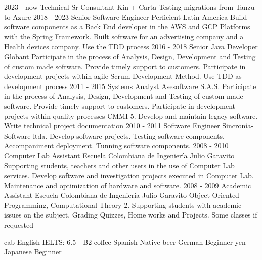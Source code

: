 \documentclass[icon]{twentysecondcv}
\begin{document}
\begin{twenty}
\twentyitem
    {2023 - now}
    {Technical Sr Consultant}
    {Kin + Carta}
    {Testing migrations from Tanzu to Azure}
\twentyitem
    {2018 - 2023}
    {Senior Software Engineer}
    {Perficient Latin America}
    {Build software components as a Back End developer in the AWS and GCP Platforms with the Spring Framework. Built software for an advertising company and a Health devices company. Use the TDD process}
\twentyitem
    {2016 - 2018}
    {Senior Java Developer}
    {Globant}
    {Participate in the process of Analysis, Design, Development and Testing of custom made software. Provide timely support to customers. Participate in development projects within agile Scrum Development Method. Use TDD as development process}
  \twentyitem
    {2011 - 2015}
    {Systems Analyst}
    {Asesoftware S.A.S.}
    {Participate in the process of Analysis, Design, Development and Testing of custom made software. Provide timely support to customers. Participate in development projects within quality processes CMMI 5. Develop and maintain legacy software. Write technical project documentation}
  \twentyitem
    {2010 - 2011}
    {Software Engineer}
    {Sincron\'ia-Software ltda.}
    {Develop software projects. Testing software components. Accompaniment deployment. Tunning software components.}
\twentyitem
    {2008 - 2010}
    {Computer Lab Assistant}
    {Escuela Colombiana de Ingenier\'ia  Julio Garavito}
    {Supporting students, teachers and other users in the use of Computer Lab services. Develop software and investigation projects executed in Computer Lab. Maintenance and optimization of hardware and software.}
\twentyitem
    {2008 - 2009}
    {Academic Assistant}
    {Escuela Colombiana de Ingenier\'ia  Julio Garavito}
    {Object Oriented Programming, Computational Theory 2. Supporting students with academic issues on the subject. Grading Quizzes, Home works and Projects. Some classes if requested}

\end{twenty}


\begin{twentyshorticon}
  \twentyitemshorticon
    {cab}
    {English}
    {IELTS: 6.5 - B2}
  \twentyitemshorticon
    {coffee}
    {Spanish}
    {Native}
  \twentyitemshorticon
    {beer}
    {German}
    {Beginner}
  \twentyitemshorticon
    {yen}
    {Japanese}
    {Beginner}
\end{twentyshorticon}


\end{document}
